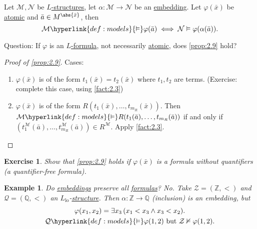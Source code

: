 \documentclass{article}
\let\models\vDash
\let\nModels\nvDash
\newtheorem{nexample}[nthm]{Example}
\newtheorem{nexercise}[nthm]{Exercise}
\begin{document}
\begin{nprop}\label{prop:2.9}
  Let $\mathcal{M}, \mathcal{N}$ be \hyperlink{def:str}{$L$-structures}, let $\alpha: \mathcal{M} \to \mathcal{N}$ be an \hyperlink{def:embedding}{embedding}.
  Let $\varphi(\bar{x})$ be \hyperlink{def:atomform}{atomic} and $\bar{a} \in M^{\abs{\bar{x}}}$, then
  \begin{equation*}
    \mathcal{M} \hyperlink{def:models}{\models} \varphi(\bar{a}) \iff \mathcal{N} \models \varphi(\alpha(\bar{a})).
  \end{equation*}
\end{nprop}

Question: If $\varphi$ is an \hyperlink{def:form}{$L$-formula}, not necessarily \hyperlink{def:atomform}{atomic}, does \cref{prop:2.9} hold?

\begin{proof}[Proof of \cref{prop:2.9}]
  Cases:
  \begin{enumerate}[label=(\roman*)]
    \item $\varphi(\bar{x})$ is of the form $t_1(\bar{x}) = t_2(\bar{x})$ where $t_1,t_2$ are terms.
      (Exercise: complete this case, using \cref{fact:2.3})
    \item $\varphi(\bar{x})$ is of the form $R(t_1(\bar{x}), \dotsc, t_{m_R}(\bar{x}))$.
      Then $\mathcal{M} \hyperlink{def:models}{\models} R(t_1(\bar{a}), \dotsc, t_{m_R}(\bar{a}))$ if and only if $(t_1^\mathcal{M}(\bar{a}), \dots, t_{m_R}^\mathcal{M}(\bar{a})) \in R^\mathcal{M}$. Apply \cref{fact:2.3}.
  \end{enumerate}
\end{proof}
\begin{nexercise}\label{ex:2.10}
  Show that \cref{prop:2.9} holds if $\varphi(\bar{x})$ is a formula without quantifiers (a quantifier-free formula).
\end{nexercise}
\begin{nexample}\label{ex:2.11}
  Do \hyperlink{def:embedding}{embeddings} preserve \emph{all} \hyperlink{def:form}{formulas}? No.
  Take $\mathcal{Z} = (\mathbb{Z}, <)$ and $\mathcal{Q} = (\mathbb{Q}, <)$ an \hyperlink{def:lgp}{$L_{\text{lo}}$}-\hyperlink{def:str}{structure}.
  Then $\alpha: \mathbb{Z} \to \mathbb{Q}$ (inclusion) is an embedding, but
  \begin{gather*}
    \varphi(x_1, x_2) = \exists x_3\,(x_1 < x_3 \wedge x_3 < x_2). \\
    \mathcal{Q} \hyperlink{def:models}{\models} \varphi(1,2) \text{ but } \mathcal{Z} \nModels \varphi(1,2).
  \end{gather*}
\end{nexample}
\end{document}
